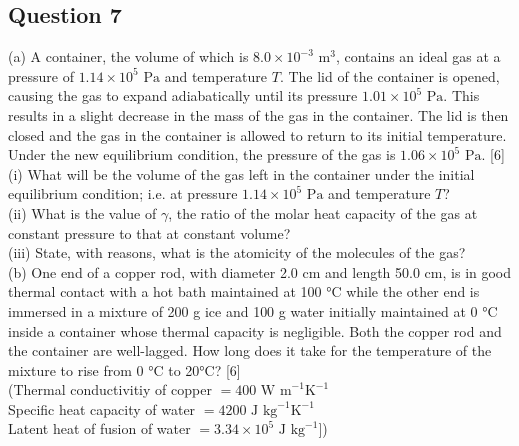 \documentclass{article}
\begin{document}
\subsection{Question 7}
(a) A container, the volume of which is $8.0\times 10^{-3} \text{ m}^3$, contains an ideal gas at a pressure of $1.14\times 10^5 \text{ Pa}$ and temperature $T$. The lid of the container is opened, causing the gas to expand adiabatically until its pressure $1.01\times 10^5 \text{ Pa}$. This results in a slight decrease in the mass of the gas in the container. The lid is then closed and the gas in the container is allowed to return to its initial temperature. Under the new equilibrium condition, the pressure of the gas is $1.06\times 10^5 \text{ Pa}$. [6] \\
(i) What will be the volume of the gas left in the container under the initial equilibrium condition; i.e. at pressure $1.14\times 10^5 \text{ Pa}$ and temperature $T$? \\
(ii) What is the value of $\gamma$, the ratio of the molar heat capacity of the gas at constant pressure to that at constant volume? \\
(iii) State, with reasons, what is the atomicity of the molecules of the gas? \\
(b) One end of a copper rod, with diameter 2.0 cm and length 50.0 cm, is in good thermal contact with a hot bath maintained at 100 °C while the other end is immersed in a mixture of 200 g ice and 100 g water initially maintained at 0 °C inside a container whose thermal capacity is negligible. Both the copper rod and the container are well-lagged. How long does it take for the temperature of the mixture to rise from 0 °C to 20°C? [6] \\
(Thermal conductivitiy of copper $= 400 \text{ W m}^{-1} \text{K}^{-1}$ \\ 
Specific heat capacity of water $=4200 \text{ J kg}^{-1} \text{K}^{-1} $ \\
Latent heat of fusion of water $= 3.34\times 10^5 \text{ J kg}^{-1}]$) 
\end{document}
